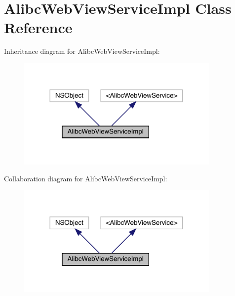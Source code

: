 \hypertarget{interface_alibc_web_view_service_impl}{}\section{Alibc\+Web\+View\+Service\+Impl Class Reference}
\label{interface_alibc_web_view_service_impl}


Inheritance diagram for Alibc\+Web\+View\+Service\+Impl\+:\nopagebreak
\begin{figure}[H]
\begin{center}
\leavevmode
\includegraphics[width=282pt]{interface_alibc_web_view_service_impl__inherit__graph}
\end{center}
\end{figure}


Collaboration diagram for Alibc\+Web\+View\+Service\+Impl\+:\nopagebreak
\begin{figure}[H]
\begin{center}
\leavevmode
\includegraphics[width=282pt]{interface_alibc_web_view_service_impl__coll__graph}
\end{center}
\end{figure}
